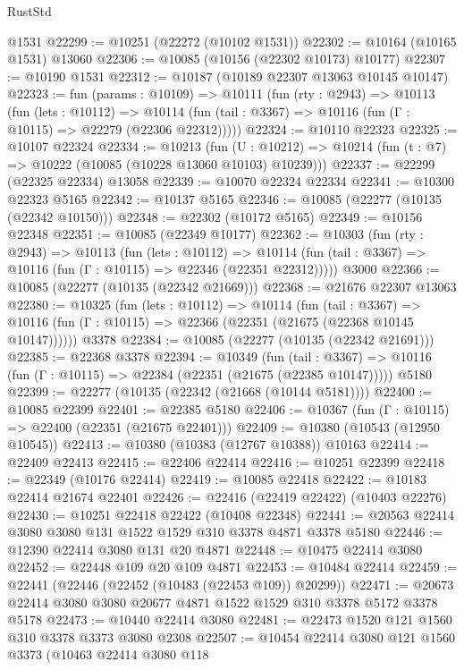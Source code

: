 \begin{lexlean}{RustStd}
\begin{coremodule}
    @1531
@22299 := @10251 (@22272 (@10102 @1531))
@22302 := @10164 (@10165 @1531) @13060
@22306 := @10085 (@10156 (@22302 @10173) @10177)
@22307 := @10190 @1531
@22312 := @10187 (@10189 @22307 @13063 @10145 @10147)
@22323 := fun (params : @10109) =>
  @10111
    (fun (rty : @2943) =>
    @10113
      (fun (lets : @10112) =>
      @10114 (fun (tail : @3367) => @10116 (fun (Γ : @10115) => @22279 (@22306 @22312)))))
@22324 := @10110 @22323
@22325 := @10107 @22324
@22334 := @10213
    (fun (U : @10212) => @10214 (fun (t : @7) => @10222 (@10085 (@10228 @13060 @10103) @10239)))
@22337 := @22299 (@22325 @22334) @13058
@22339 := @10070 @22324 @22334
@22341 := @10300 @22323 @5165
@22342 := @10137 @5165
@22346 := @10085 (@22277 (@10135 (@22342 @10150)))
@22348 := @22302 (@10172 @5165)
@22349 := @10156 @22348
@22351 := @10085 (@22349 @10177)
@22362 := @10303
    (fun (rty : @2943) =>
    @10113
      (fun (lets : @10112) =>
      @10114 (fun (tail : @3367) => @10116 (fun (Γ : @10115) => @22346 (@22351 @22312)))))
    @3000
@22366 := @10085 (@22277 (@10135 (@22342 @21669)))
@22368 := @21676 @22307 @13063
@22380 := @10325
    (fun (lets : @10112) =>
    @10114
      (fun (tail : @3367) =>
      @10116 (fun (Γ : @10115) => @22366 (@22351 (@21675 (@22368 @10145 @10147))))))
    @3378
@22384 := @10085 (@22277 (@10135 (@22342 @21691)))
@22385 := @22368 @3378
@22394 := @10349
    (fun (tail : @3367) => @10116 (fun (Γ : @10115) => @22384 (@22351 (@21675 (@22385 @10147)))))
    @5180
@22399 := @22277 (@10135 (@22342 (@21668 (@10144 @5181))))
@22400 := @10085 @22399
@22401 := @22385 @5180
@22406 := @10367 (fun (Γ : @10115) => @22400 (@22351 (@21675 @22401)))
@22409 := @10380 (@10543 (@12950 @10545))
@22413 := @10380 (@10383 (@12767 @10388)) @10163
@22414 := @22409 @22413
@22415 := @22406 @22414
@22416 := @10251 @22399
@22418 := @22349 (@10176 @22414)
@22419 := @10085 @22418
@22422 := @10183 @22414 @21674 @22401
@22426 := @22416 (@22419 @22422) (@10403 @22276)
@22430 := @10251 @22418 @22422 (@10408 @22348)
@22441 := @20563 @22414 @3080 @3080 @131 @1522 @1529 @310 @3378 @4871 @3378 @5180
@22446 := @12390 @22414 @3080 @131 @20 @4871
@22448 := @10475 @22414 @3080
@22452 := @22448 @109 @20 @109 @4871
@22453 := @10484 @22414
@22459 := @22441 (@22446 (@22452 (@10483 (@22453 @109)) @20299))
@22471 := @20673 @22414 @3080 @3080 @20677 @4871 @1522 @1529 @310 @3378 @5172 @3378 @5178
@22473 := @10440 @22414 @3080
@22481 := @22473 @1520 @121 @1560 @310 @3378 @3373 @3080 @2308
@22507 := @10454
    @22414
    @3080
    @121
    @1560
    @3373
    (@10463
      @22414
      @3080
      @118

\end{coremodule}
\end{lexlean}
